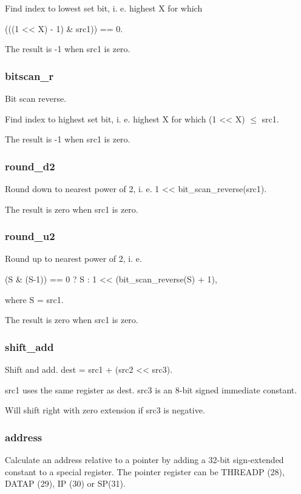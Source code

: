 \documentclass[forwardcom.tex]{subfiles}
\begin{document}
Find index to lowest set bit, i. e. highest X for which 

(((1 \textless\textless{} X) - 1) \& src1)) == 0.

The result is -1 when src1 is zero.

\subsubsection{bitscan\_r}
Bit scan reverse. 

Find index to highest set bit, i. e. highest X for which (1 \textless\textless{} X) $\leq$ src1.

The result is -1 when src1 is zero.

\subsubsection{round\_d2}
Round down to nearest power of 2, i. e. 1 \textless\textless{} bit\_scan\_reverse(src1).

The result is zero when src1 is zero.

\subsubsection{round\_u2}
Round up to nearest power of 2, i. e. 

(S \& (S-1)) == 0 ? S : 1 \textless\textless{}  (bit\_scan\_reverse(S) + 1),

where S = src1.

The result is zero when src1 is zero.

\subsubsection{shift\_add}
Shift and add. dest = src1 + (src2 \textless\textless{}  src3).
\vspace{2mm}

src1 uses the same register as dest. src3 is an 8-bit signed immediate constant.
\vspace{2mm}

Will shift right with zero extension if src3 is negative.

\subsubsection{address}
Calculate an address relative to a pointer by adding a 32-bit sign-extended constant to a  special register. The pointer register can be THREADP (28), DATAP (29), IP (30) or SP(31).
\end{document}
